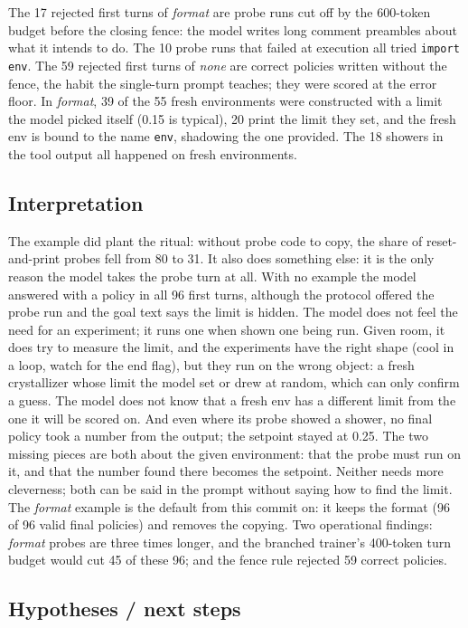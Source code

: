\documentclass[11pt,a4paper]{article}
\begin{document}
The 17 rejected first turns of \emph{format} are probe runs cut off by the
600-token budget before the closing fence: the model writes long comment
preambles about what it intends to do. The 10 probe runs that failed at
execution all tried \texttt{import env}. The 59 rejected first turns of
\emph{none} are correct policies written without the fence, the habit the
single-turn prompt teaches; they were scored at the error floor. In
\emph{format}, 39 of the 55 fresh environments were constructed with a limit
the model picked itself (0.15 is typical), 20 print the limit they set, and
the fresh env is bound to the name \texttt{env}, shadowing the one provided.
The 18 showers in the tool output all happened on fresh environments.

\subsection*{Interpretation}

The example did plant the ritual: without probe code to copy, the share of
reset-and-print probes fell from 80 to 31. It also does something else: it is
the only reason the model takes the probe turn at all. With no example the
model answered with a policy in all 96 first turns, although the protocol
offered the probe run and the goal text says the limit is hidden. The model
does not feel the need for an experiment; it runs one when shown one being
run. Given room, it does try to measure the limit, and the experiments have
the right shape (cool in a loop, watch for the end flag), but they run on the
wrong object: a fresh crystallizer whose limit the model set or drew at
random, which can only confirm a guess. The model does not know that a fresh
env has a different limit from the one it will be scored on. And even where
its probe showed a shower, no final policy took a number from the output;
the setpoint stayed at 0.25. The two missing pieces are both about the given
environment: that the probe must run on it, and that the number found there
becomes the setpoint. Neither needs more cleverness; both can be said in the
prompt without saying how to find the limit. The \emph{format} example is the
default from this commit on: it keeps the format (96 of 96 valid final
policies) and removes the copying. Two operational findings: \emph{format}
probes are three times longer, and the branched trainer's 400-token turn
budget would cut 45 of these 96; and the fence rule rejected 59 correct
policies.

\subsection*{Hypotheses / next steps}
\end{document}
